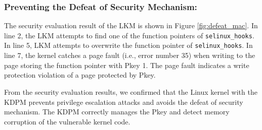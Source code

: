 \subsubsection{Preventing the Defeat of Security Mechanism:}
The security evaluation result of the LKM is shown in Figure
\ref{fig:defeat_mac}.
In line 2, the LKM attempts to find one of the function pointers of
\verb|selinux_hooks|. In line 5, LKM attempts to overwrite the function pointer of
\verb|selinux_hooks|.
In line 7, the kernel catches a page fault (i.e., error number 35) when writing
to the page storing the function pointer with Pkey 1. The page fault
indicates a write protection violation of a page protected by Pkey.

%

From the security evaluation results, we confirmed that the Linux kernel with the
KDPM prevents privilege escalation attacks and avoids the defeat of security mechanism.
The KDPM correctly manages the Pkey and detect
memory corruption of the vulnerable kernel code.


